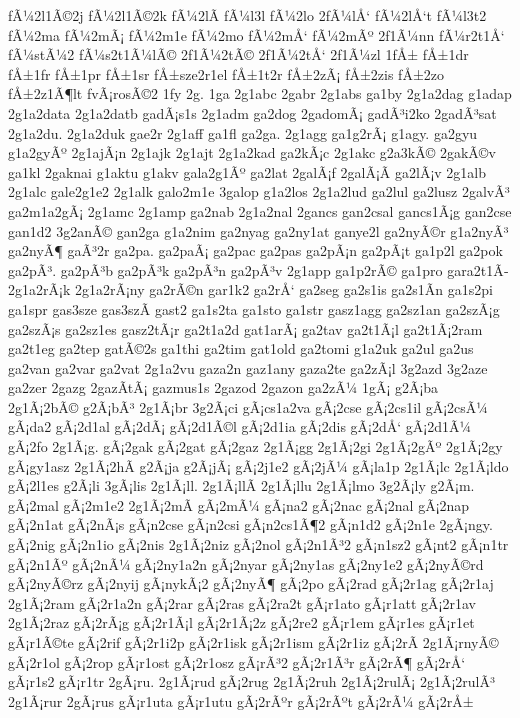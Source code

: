 {fÃ¼2l1Ã©2j
fÃ¼2l1Ã©2k
fÃ¼2lÃ­
fÃ¼l3l
fÃ¼2lo
2fÃ¼lÅ‘
fÃ¼2lÅ‘t
fÃ¼l3t2
fÃ¼2ma
fÃ¼2mÃ¡
fÃ¼2m1e
fÃ¼2mo
fÃ¼2mÅ‘
fÃ¼2mÃº
2f1Ã¼nn
fÃ¼r2t1Å‘
fÃ¼stÃ¼2
fÃ¼s2t1Ã¼lÃ©
2f1Ã¼2tÃ©
2f1Ã¼2tÅ‘
2f1Ã¼zl
1fÅ±
fÅ±1dr
fÅ±1fr
fÅ±1pr
fÅ±1sr
fÅ±sze2r1el
fÅ±1t2r
fÅ±2zÃ¡
fÅ±2zis
fÅ±2zo
fÅ±2z1Ã¶lt
fvÃ¡rosÃ©2
1fy
2g.
1ga
2g1abc
2gabr
2g1abs
ga1by
2g1a2dag
g1adap
2g1a2data
2g1a2datb
gadÃ¡s1s
2g1adm
ga2dog
2gadomÃ¡
gadÃ³i2ko
2gadÃ³sat
2g1a2du.
2g1a2duk
gae2r
2g1aff
ga1fl
ga2ga.
2g1agg
ga1g2rÃ¡
g1agy.
ga2gyu
g1a2gyÃº
2g1ajÃ¡n
2g1ajk
2g1ajt
2g1a2kad
ga2kÃ¡c
2g1akc
g2a3kÃ©
2gakÃ©v
ga1kl
2gaknai
g1aktu
g1akv
gala2g1Ãº
ga2lat
2galÃ¡f
2galÃ¡Ã­
ga2lÃ¡v
2g1alb
2g1alc
gale2g1e2
2g1alk
galo2m1e
3galop
g1a2los
2g1a2lud
ga2lul
ga2lusz
2galvÃ³
ga2m1a2gÃ¡
2g1amc
2g1amp
ga2nab
2g1a2nal
2gancs
gan2csal
gancs1Ã¡g
gan2cse
gan1d2
3g2anÃ©
gan2ga
g1a2nim
ga2nyag
ga2ny1at
ganye2l
ga2nyÃ©r
g1a2nyÃ³
ga2nyÃ¶
gaÃ³2r
ga2pa.
ga2paÃ¡
ga2pac
ga2pas
ga2pÃ¡n
ga2pÃ¡t
ga1p2l
ga2pok
ga2pÃ³.
ga2pÃ³b
ga2pÃ³k
ga2pÃ³n
ga2pÃ³v
2g1app
ga1p2rÃ©
ga1pro
gara2t1Ã­
2g1a2rÃ¡k
2g1a2rÃ¡ny
ga2rÃ©n
gar1k2
ga2rÅ‘
ga2seg
ga2s1is
ga2s1Ã­n
ga1s2pi
ga1spr
gas3sze
gas3szÃ­
gast2
ga1s2ta
ga1sto
ga1str
gasz1agg
ga2sz1an
ga2szÃ¡g
ga2szÃ¡s
ga2sz1es
gasz2tÃ¡r
ga2t1a2d
gat1arÃ¡
ga2tav
ga2t1Ã¡l
ga2t1Ã¡2ram
ga2t1eg
ga2tep
gatÃ©2s
ga1thi
ga2tim
gat1old
ga2tomi
g1a2uk
ga2ul
ga2us
ga2van
ga2var
ga2vat
2g1a2vu
gaza2n
gaz1any
gaza2te
ga2zÃ¡l
3g2azd
3g2aze
ga2zer
2gazg
2gazÃ­tÃ¡
gazmus1s
2gazod
2gazon
ga2zÃ¼
1gÃ¡
g2Ã¡ba
2g1Ã¡2bÃ©
g2Ã¡bÃ³
2g1Ã¡br
3g2Ã¡ci
gÃ¡cs1a2va
gÃ¡2cse
gÃ¡2cs1il
gÃ¡2csÃ¼
gÃ¡da2
gÃ¡2d1al
gÃ¡2dÃ¡
gÃ¡2d1Ã©l
gÃ¡2d1ia
gÃ¡2dis
gÃ¡2dÅ‘
gÃ¡2d1Ã¼
gÃ¡2fo
2g1Ã¡g.
gÃ¡2gak
gÃ¡2gat
gÃ¡2gaz
2g1Ã¡gg
2g1Ã¡2gi
2g1Ã¡2gÃº
2g1Ã¡2gy
gÃ¡gy1asz
2g1Ã¡2hÃ­
g2Ã¡ja
g2Ã¡jÃ¡
gÃ¡2j1e2
gÃ¡2jÃ¼
gÃ¡la1p
2g1Ã¡lc
2g1Ã¡ldo
gÃ¡2l1es
g2Ã¡li
3gÃ¡lis
2g1Ã¡ll.
2g1Ã¡llÃ­
2g1Ã¡llu
2g1Ã¡lmo
3g2Ã¡ly
g2Ã¡m.
gÃ¡2mal
gÃ¡2m1e2
2g1Ã¡2mÃ­
gÃ¡2mÃ¼
gÃ¡na2
gÃ¡2nac
gÃ¡2nal
gÃ¡2nap
gÃ¡2n1at
gÃ¡2nÃ¡s
gÃ¡n2cse
gÃ¡n2csi
gÃ¡n2cs1Ã¶2
gÃ¡n1d2
gÃ¡2n1e
2gÃ¡ngy.
gÃ¡2nig
gÃ¡2n1io
gÃ¡2nis
2g1Ã¡2niz
gÃ¡2nol
gÃ¡2n1Ã³2
gÃ¡n1sz2
gÃ¡nt2
gÃ¡n1tr
gÃ¡2n1Ãº
gÃ¡2nÃ¼
gÃ¡2ny1a2n
gÃ¡2nyar
gÃ¡2ny1as
gÃ¡2ny1e2
gÃ¡2nyÃ©rd
gÃ¡2nyÃ©rz
gÃ¡2nyij
gÃ¡nykÃ¡2
gÃ¡2nyÃ¶
gÃ¡2po
gÃ¡2rad
gÃ¡2r1ag
gÃ¡2r1aj
2g1Ã¡2ram
gÃ¡2r1a2n
gÃ¡2rar
gÃ¡2ras
gÃ¡2ra2t
gÃ¡r1ato
gÃ¡r1att
gÃ¡2r1av
2g1Ã¡2raz
gÃ¡2rÃ¡g
gÃ¡2r1Ã¡l
gÃ¡2r1Ã¡2z
gÃ¡2re2
gÃ¡r1em
gÃ¡r1es
gÃ¡r1et
gÃ¡r1Ã©te
gÃ¡2rif
gÃ¡2r1i2p
gÃ¡2r1isk
gÃ¡2r1ism
gÃ¡2r1iz
gÃ¡2rÃ­
2g1Ã¡rnyÃ©
gÃ¡2r1ol
gÃ¡2rop
gÃ¡r1ost
gÃ¡2r1osz
gÃ¡rÃ³2
gÃ¡2r1Ã³r
gÃ¡2rÃ¶
gÃ¡2rÅ‘
gÃ¡r1s2
gÃ¡r1tr
2gÃ¡ru.
2g1Ã¡rud
gÃ¡2rug
2g1Ã¡2ruh
2g1Ã¡2rulÃ¡
2g1Ã¡2rulÃ³
2g1Ã¡rur
2gÃ¡rus
gÃ¡r1uta
gÃ¡r1utu
gÃ¡2rÃºr
gÃ¡2rÃºt
gÃ¡2rÃ¼
gÃ¡2rÅ±
}
